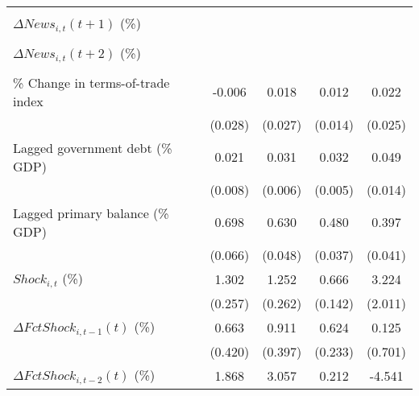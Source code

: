 {\begin{tabular}{l*{4}{c}}
                    &                     &                     &                     &                     \\
\addlinespace
$ \Delta News_{i,t}(t+1)$ (\%)&                     &                     &                     &                     \\
                    &                     &                     &                     &                     \\
\addlinespace
$ \Delta News_{i,t}(t+2)$ (\%)&                     &                     &                     &                     \\
                    &                     &                     &                     &                     \\
\addlinespace
\% Change in terms-of-trade index&      -0.006         &       0.018         &       0.012         &       0.022         \\
                    &     (0.028)         &     (0.027)         &     (0.014)         &     (0.025)         \\
\addlinespace
Lagged government debt (\% GDP)&       0.021\sym{**} &       0.031\sym{***}&       0.032\sym{***}&       0.049\sym{***}\\
                    &     (0.008)         &     (0.006)         &     (0.005)         &     (0.014)         \\
\addlinespace
Lagged primary balance (\% GDP)&       0.698\sym{***}&       0.630\sym{***}&       0.480\sym{***}&       0.397\sym{***}\\
                    &     (0.066)         &     (0.048)         &     (0.037)         &     (0.041)         \\
\addlinespace
$ Shock_{i,t}$ (\%) &       1.302\sym{***}&       1.252\sym{***}&       0.666\sym{***}&       3.224         \\
                    &     (0.257)         &     (0.262)         &     (0.142)         &     (2.011)         \\
\addlinespace
$ \Delta FctShock_{i,t-1}(t)$ (\%)&       0.663         &       0.911\sym{**} &       0.624\sym{**} &       0.125         \\
                    &     (0.420)         &     (0.397)         &     (0.233)         &     (0.701)         \\
\addlinespace
$ \Delta FctShock_{i,t-2}(t)$ (\%)&       1.868         &       3.057\sym{**} &       0.212         &      -4.541         \\

\end{tabular}}
